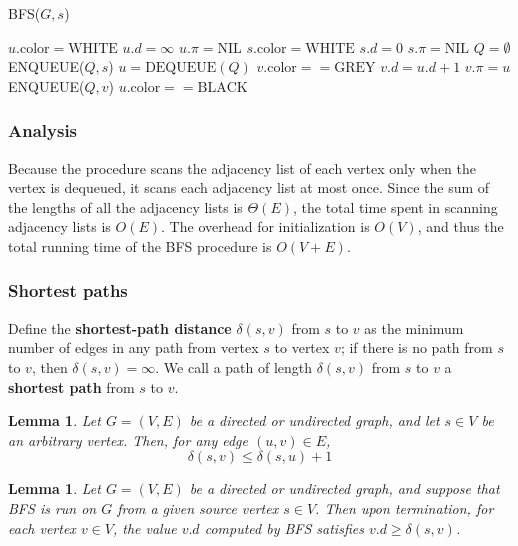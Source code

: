 \documentclass[12pt]{article}
\newtheorem{lemma}[theorem]{Lemma}
\begin{document}
BFS($G, s$)
\begin{algorithmic}[1]
	\State $u.\text{color} = \text{WHITE}$
	\State $u.d = \infty$
	\State $u.\pi = \text{NIL}$
\EndFor
\State $s.\text{color} = \text{WHITE}$
\State $s.d = 0$
\State $s.\pi = \text{NIL}$
\State $Q = \emptyset$
\State ENQUEUE($Q,s$)
	\State $u = \text{DEQUEUE}(Q)$
                	\State $v.\text{color} == \text{GREY}$
                        \State $v.d = u.d + 1$
                        \State $v.\pi = u$
                        \State ENQUEUE($Q, v$)
                \EndIf
        \EndFor
        \State $u.\text{color} == \text{BLACK}$
\EndWhile
\end{algorithmic}

\subsubsection*{Analysis}

Because the procedure scans the adjacency list of each vertex only when the vertex is dequeued, it scans each adjacency list at most once. Since the sum of the lengths of all the adjacency lists is $\Theta(E)$, the total time spent in scanning adjacency lists is $O(E)$. The overhead for initialization is $O(V)$, and thus the total running time of the BFS procedure is $O(V+E)$.

\subsubsection*{Shortest paths}

Define the \textbf{shortest-path distance} $\delta(s,v)$ from $s$ to $v$ as the minimum number of edges in any path from vertex $s$ to vertex $v$; if there is no path from $s$ to $v$, then $\delta (s,v) = \infty$. We call a path of length $\delta(s,v)$ from $s$ to $v$ a \textbf{shortest path} from $s$ to $v$.

\begin{lemma}
  Let $G = (V,E)$ be a directed or undirected graph, and let $s \in V$ be an arbitrary vertex. Then, for any edge $(u,v) \in E$,
  \begin{equation*}
    \delta(s,v) \le \delta(s,u) + 1
  \end{equation*}
\end{lemma}

\begin{lemma}
  Let $G = (V,E)$ be a directed or undirected graph, and suppose that BFS is run on $G$ from a given source vertex $s \in V$. Then upon termination, for each vertex $v \in V$, the value $v.d$ computed by BFS satisfies $v.d \ge \delta(s,v)$.
\end{lemma}
\end{document}
